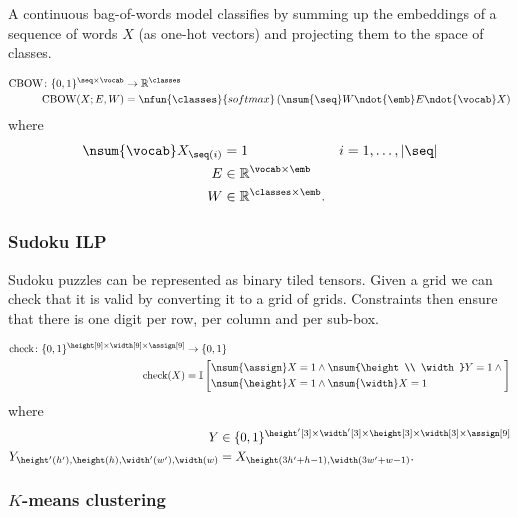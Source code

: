 A continuous bag-of-words model classifies by summing up the embeddings of a sequence of words $X$ (as one-hot vectors) and projecting them to the space of classes. 

\begin{align*}
\text{CBOW} \colon \{0, 1\}^{\seq \times \vocab} &\rightarrow \reals^{\classes} \\
\text{CBOW}(X; E, W) &= \nfun{\classes}{softmax} \left(\nsum{\seq} W \ndot{\emb} E \ndot{\vocab} X\right)
\end{align*}
where
\begin{align*}
\nsum{\vocab} X_{\seq(i)} &= 1 & i &= 1, \ldots, |\seq| \\
E &\in \reals^{\vocab \times \emb} \\
W &\in \reals^{\classes \times \emb}.
\end{align*}

\subsubsection{Sudoku ILP}


Sudoku puzzles can be represented as  binary tiled tensors.
Given a grid we can check that it is valid by converting it to a grid of grids. 
Constraints then ensure that there is one digit per row, per column and per sub-box.

\begin{align*}
\text{check} \colon \{0, 1\}^{\height[9] \times \width[9] \times \assign[9]} &\rightarrow \{0, 1\} \\
\text{check}(X) &=
\mathbb{I}\left[\begin{aligned}
\nsum{\assign} X = 1 &\land \nsum{\height \\ \width} Y = 1 \land {} \\
\nsum{\height} X = 1 &\land \nsum{\width} X = 1
\end{aligned}\right]
\end{align*}
where
\begin{align*}
Y &\in \{0, 1\}^{\height'[3] \times \width'[3] \times \height[3] \times \width[3] \times \assign[9]}  \\
Y_{\height'(h'), \height(h), \width'(w'), \width(w)} &= X_{\height(3h' + h-1), \width(3 w' + w-1)}.
\end{align*} 

\subsubsection{$K$-means clustering}

